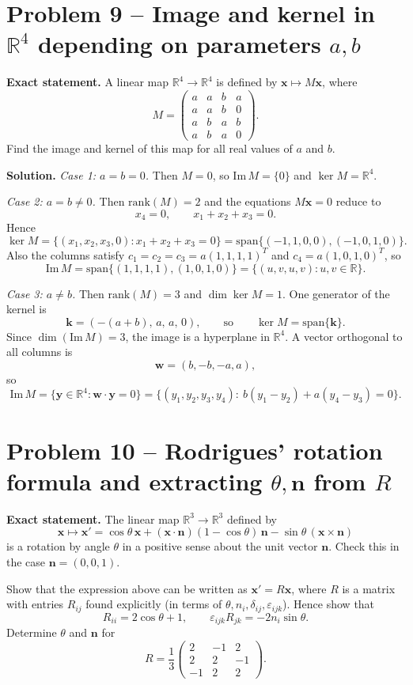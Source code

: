 \documentclass[12pt,a4paper]{article}
\theoremstyle{plain}
\theoremstyle{definition}      %
\begin{document}
\section*{Problem 9 -- Image and kernel in $\mathbb R^4$ depending on parameters $a,b$}

\textbf{Exact statement.}
A linear map $\mathbb R^4\to\mathbb R^4$ is defined by $\mathbf x\mapsto M\mathbf x$, where
\[
M=\begin{pmatrix}
	a&a&b&a\\
	a&a&b&0\\
	a&b&a&b\\
	a&b&a&0
\end{pmatrix}.
\]
Find the image and kernel of this map for all real values of $a$ and $b$.

\textbf{Solution.}
\emph{Case 1: $a=b=0$.} Then $M=0$, so $\mathrm{Im}\,M=\{0\}$ and $\ker M=\mathbb R^4$.

\emph{Case 2: $a=b\neq 0$.} Then $\mathrm{rank}(M)=2$ and the equations $M\mathbf x=0$ reduce to
\[
x_4=0,\qquad x_1+x_2+x_3=0.
\]
Hence
\[
\ker M=\{(x_1,x_2,x_3,0):x_1+x_2+x_3=0\}
=\mathrm{span}\{(-1,1,0,0),(-1,0,1,0)\}.
\]
Also the columns satisfy $c_1=c_2=c_3=a(1,1,1,1)^T$ and $c_4=a(1,0,1,0)^T$, so
\[
\mathrm{Im}\,M=\mathrm{span}\{(1,1,1,1),(1,0,1,0)\}
=\{(u,v,u,v):u,v\in\mathbb R\}.
\]

\emph{Case 3: $a\neq b$.} Then $\mathrm{rank}(M)=3$ and $\dim\ker M=1$. One generator of the kernel is
\[
\mathbf k=(-(a+b),\,a,\,a,\,0),
\qquad\text{so}\qquad
\ker M=\mathrm{span}\{\mathbf k\}.
\]
Since $\dim(\mathrm{Im}\,M)=3$, the image is a hyperplane in $\mathbb R^4$. A vector orthogonal to all columns is
\[
\mathbf w=(b,-b,-a,a),
\]
so
\[
\mathrm{Im}\,M=\{\mathbf y\in\mathbb R^4:\mathbf w\cdot\mathbf y=0\}
=\{(y_1,y_2,y_3,y_4):\ b(y_1-y_2)+a(y_4-y_3)=0\}.
\]

\section*{Problem 10 -- Rodrigues' rotation formula and extracting $\theta,\mathbf n$ from $R$}

\textbf{Exact statement.}
The linear map $\mathbb R^3\to\mathbb R^3$ defined by
\[
\mathbf x\mapsto \mathbf x'=\cos\theta\,\mathbf x+(\mathbf x\cdot\mathbf n)(1-\cos\theta)\,\mathbf n-\sin\theta\,(\mathbf x\times\mathbf n)
\]
is a rotation by angle $\theta$ in a positive sense about the unit vector $\mathbf n$.
Check this in the case $\mathbf n=(0,0,1)$.

Show that the expression above can be written as $\mathbf x'=R\mathbf x$, where $R$ is a matrix with entries $R_{ij}$ found explicitly (in terms of $\theta,n_i,\delta_{ij},\varepsilon_{ijk}$). Hence show that
\[
R_{ii}=2\cos\theta+1,\qquad \varepsilon_{ijk}R_{jk}=-2n_i\sin\theta.
\]
Determine $\theta$ and $\mathbf n$ for
\[
R=\frac13\begin{pmatrix}
	2&-1&2\\
	2&2&-1\\
	-1&2&2
\end{pmatrix}.
\]
\end{document}
